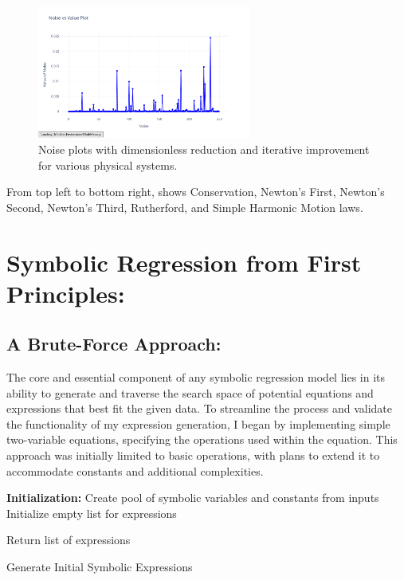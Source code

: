 \documentclass{article}
\begin{document}
\begin{figure}[H]
    \includegraphics[width=7cm]{noise_Simple_Harmonic_Motion_d_i}
    \caption{Noise plots with dimensionless reduction and iterative improvement for various physical systems.}
    \label{fig:noise_dimless_iterative_plots}
\end{figure}

From top left to bottom right, shows Conservation, Newton's First, Newton's Second, Newton's Third, Rutherford, and Simple Harmonic Motion laws.\\  




\section{Symbolic Regression from First Principles: }


\subsection{A Brute-Force Approach: }

The core and essential component of any symbolic regression model lies in its ability to generate and traverse the search space of potential equations and expressions that best fit the given data. To streamline the process and validate the functionality of my expression generation, I began by implementing simple two-variable equations, specifying the operations used within the equation. This approach was initially limited to basic operations, with plans to extend it to accommodate constants and additional complexities.\\


\begin{algorithm}[H]
\SetAlgoLined
{}

\textbf{Initialization:}\;
Create pool of symbolic variables and constants from inputs\;
Initialize empty list for expressions\;


Return list of expressions\;

\caption{Generate Initial Symbolic Expressions}
\label{alg:generate_expressions} %
\end{algorithm}\\
\end{document}
